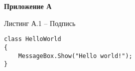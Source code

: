 \newpage
{} 
\begin{center} 
    \textbf{Приложение А}
\end{center} 
\vspace{8mm}
\par
Листинг А.1 -- Подпись
\vspace{8mm}
\large
\begin{verbatim}
class HelloWorld
{
    MessageBox.Show("Hello world!");         
}
\end{verbatim}
\vspace{8mm}
\Large